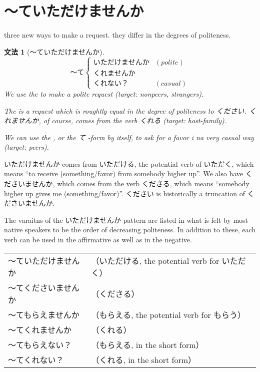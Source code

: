\documentclass[notoc,notitlepage]{tufte-book}
\newtheorem{grammar}{\faBook \enspace 文法}[section]
\begin{document}

\section{〜ていただけませんか}%
\label{sec:_teitadakemasenka}

 three new ways to make a request. they differ in the degrees of politeness.

\begin{grammar}[〜ていただけませんか]
\label{grammar:_teitadakemasenka}
  \begin{equation*}
    〜て \begin{cases}
      いただけませんか & (polite) \\
      くれませんか     & \\
      くれない？       & (casual)
    \end{cases}
  \end{equation*}
  We use the  to make a polite request (target: nonpeers, strangers).

  The  is a request which is roughtly equal in the degree of politeness to ください. くれませんか, of course, comes from the verb くれる (target: host-family).

  We can use the , or the て -form by itself, to ask for a favor i na very casual way (target: peers).
\end{grammar}

\begin{note}
  いただけませんか comes from いただける, the potential verb of いただく, which means ``to receive (something/favor) from somebody higher up''. We also have くださいませんか, which comes from the verb くださる, which means ``somebody higher up gives me (something/favor)''. ください is historically a truncation of くださいませんか.

  The varaitns of the いただけませんか pattern are listed in what is felt by most native speakers to be the order of decreasing politeness. In addition to these, each verb can be used in the affirmative as well as in the negative.

  \begin{tabular}{l l}
    〜ていただけませんか & （いただける, the potential verb for いただく）\\
    〜てくださいませんか & （くださる）\\
    〜てもらえませんか & （もらえる, the potential verb for もらう）\\
    〜てくれませんか & （くれる）\\
    〜てもらえない？ & （もらえる, in the short form）\\
    〜てくれない？ & （くれる, in the short form）
  \end{tabular}
\end{note}
\end{document}
